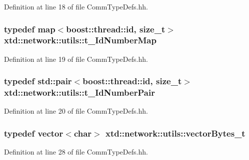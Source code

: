 Definition at line 18 of file Comm\-Type\-Defs.\-hh.

\hypertarget{namespacextd_1_1network_1_1utils_a778bf7884b2296561ffc1fc5a5f14e38}{
\subsubsection[{t\-\_\-\-Id\-Number\-Map}]{\setlength{\rightskip}{0pt plus 5cm}typedef map$<$boost\-::thread\-::id, size\-\_\-t$>$ {\bf xtd\-::network\-::utils\-::t\-\_\-\-Id\-Number\-Map}}}\label{namespacextd_1_1network_1_1utils_a778bf7884b2296561ffc1fc5a5f14e38}


Definition at line 19 of file Comm\-Type\-Defs.\-hh.

\hypertarget{namespacextd_1_1network_1_1utils_aa6bd02256b6023347de116a773dd9500}{
\subsubsection[{t\-\_\-\-Id\-Number\-Pair}]{\setlength{\rightskip}{0pt plus 5cm}typedef std\-::pair$<$boost\-::thread\-::id, size\-\_\-t$>$ {\bf xtd\-::network\-::utils\-::t\-\_\-\-Id\-Number\-Pair}}}\label{namespacextd_1_1network_1_1utils_aa6bd02256b6023347de116a773dd9500}


Definition at line 20 of file Comm\-Type\-Defs.\-hh.

\hypertarget{namespacextd_1_1network_1_1utils_a9fedf0d18549b8034e9ae347955e9a9a}{
\subsubsection[{vector\-Bytes\-\_\-t}]{\setlength{\rightskip}{0pt plus 5cm}typedef vector$<$char$>$ {\bf xtd\-::network\-::utils\-::vector\-Bytes\-\_\-t}}}\label{namespacextd_1_1network_1_1utils_a9fedf0d18549b8034e9ae347955e9a9a}


Definition at line 28 of file Comm\-Type\-Defs.\-hh.


